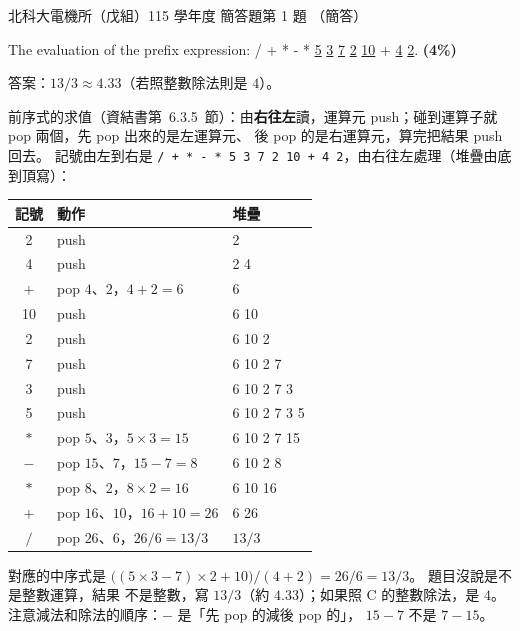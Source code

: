 \begin{pastexam}[label={px:ntut-115-ee-ds-16}]{北科大電機所（戊組）115 學年度 簡答題第 1 題}
（簡答）

The evaluation of the prefix expression: / + * - * \underline{5} \underline{3} \underline{7}
\underline{2} \underline{10} + \underline{4} \underline{2}. \textbf{(4\%)}
\end{pastexam}

\begin{pastsoln}
答案：$13/3 \approx 4.33$（若照整數除法則是 $4$）。

前序式的求值（資結書第~6.3.5~節）：由\textbf{右往左}讀，運算元 push；碰到運算子就 pop 兩個，先 pop 出來的是左運算元、
後 pop 的是右運算元，算完把結果 push 回去。 記號由左到右是
\texttt{/ + * - * 5 3 7 2 10 + 4 2}，由右往左處理（堆疊由底到頂寫）：
\begin{center}
\small
\begin{tabular}{cll}
\toprule
記號 & 動作 & 堆疊 \\
\midrule
2 & push & 2 \\
4 & push & 2 4 \\
$+$ & pop $4$、$2$，$4 + 2 = 6$ & 6 \\
10 & push & 6 10 \\
2 & push & 6 10 2 \\
7 & push & 6 10 2 7 \\
3 & push & 6 10 2 7 3 \\
5 & push & 6 10 2 7 3 5 \\
$*$ & pop $5$、$3$，$5 \times 3 = 15$ & 6 10 2 7 15 \\
$-$ & pop $15$、$7$，$15 - 7 = 8$ & 6 10 2 8 \\
$*$ & pop $8$、$2$，$8 \times 2 = 16$ & 6 10 16 \\
$+$ & pop $16$、$10$，$16 + 10 = 26$ & 6 26 \\
$/$ & pop $26$、$6$，$26 / 6 = 13/3$ & $13/3$ \\
\bottomrule
\end{tabular}
\end{center}
對應的中序式是 $\bigl((5 \times 3 - 7) \times 2 + 10\bigr) / (4 + 2) = 26/6 = 13/3$。 題目沒說是不是整數運算，結果
不是整數，寫 $13/3$（約 $4.33$）；如果照 C 的整數除法，是 $4$。 注意減法和除法的順序：$-$ 是「先 pop 的減後 pop 的」，
$15 - 7$ 不是 $7 - 15$。
\end{pastsoln}
